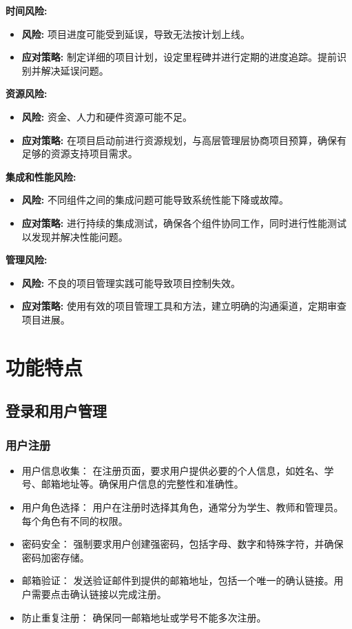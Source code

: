 \documentclass{article}
\begin{document}
\textbf{时间风险:}
\begin{itemize}
	\item \textbf{风险:} 项目进度可能受到延误，导致无法按计划上线。
	\item \textbf{应对策略:} 制定详细的项目计划，设定里程碑并进行定期的进度追踪。提前识别并解决延误问题。
\end{itemize}

\textbf{资源风险:}
\begin{itemize}
	\item \textbf{风险:} 资金、人力和硬件资源可能不足。
	\item \textbf{应对策略:} 在项目启动前进行资源规划，与高层管理层协商项目预算，确保有足够的资源支持项目需求。
\end{itemize}

\textbf{集成和性能风险:}
\begin{itemize}
	\item \textbf{风险:} 不同组件之间的集成问题可能导致系统性能下降或故障。
	\item \textbf{应对策略:} 进行持续的集成测试，确保各个组件协同工作，同时进行性能测试以发现并解决性能问题。
\end{itemize}

\textbf{管理风险:}
\begin{itemize}
	\item \textbf{风险:} 不良的项目管理实践可能导致项目控制失效。
	\item \textbf{应对策略:} 使用有效的项目管理工具和方法，建立明确的沟通渠道，定期审查项目进展。
\end{itemize}

\section{功能特点}

\subsection{登录和用户管理}
\subsubsection{用户注册}
\begin{itemize}
  \item 用户信息收集： 在注册页面，要求用户提供必要的个人信息，如姓名、学号、邮箱地址等。确保用户信息的完整性和准确性。
  \item 用户角色选择： 用户在注册时选择其角色，通常分为学生、教师和管理员。每个角色有不同的权限。
  \item 密码安全： 强制要求用户创建强密码，包括字母、数字和特殊字符，并确保密码加密存储。
  \item 邮箱验证： 发送验证邮件到提供的邮箱地址，包括一个唯一的确认链接。用户需要点击确认链接以完成注册。
  \item 防止重复注册： 确保同一邮箱地址或学号不能多次注册。
\end{itemize}
\end{document}
